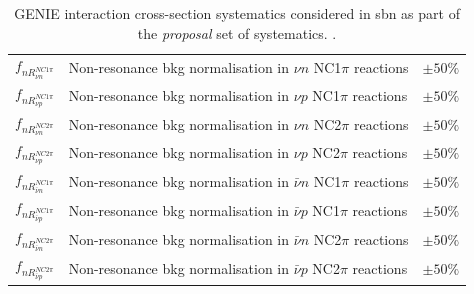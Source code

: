 \begin{table}[h!]
\begin{tabular}{p{1.8cm} p{10cm}>{\centering\arraybackslash}p{ 2.2cm}}
         $f_{nR_{\nu n}^{NC1\pi}}$ & Non-resonance bkg normalisation in $\nu n$ NC1$\pi$ reactions & $\pm 50\%$ \\
         
         $f_{nR_{\nu p}^{NC1\pi}}$ & Non-resonance bkg normalisation in $\nu p$ NC1$\pi$ reactions & $\pm 50\%$ \\
         
         $f_{nR_{\nu n}^{NC2\pi}}$ & Non-resonance bkg normalisation in $\nu n$ NC2$\pi$ reactions & $\pm 50\%$ \\
         
         $f_{nR_{\nu p}^{NC2\pi}}$ & Non-resonance bkg normalisation in $\nu p$ NC2$\pi$ reactions & $\pm 50\%$ \\
         
         $f_{nR_{\bar{\nu} n}^{NC1\pi}}$ & Non-resonance bkg normalisation in $\bar{\nu} n$ NC1$\pi$ reactions & $\pm 50\%$ \\
         
         $f_{nR_{\bar{\nu} p}^{NC1\pi}}$ & Non-resonance bkg normalisation in $\bar{\nu} p$ NC1$\pi$ reactions & $\pm 50\%$ \\
         
         $f_{nR_{\bar{\nu} n}^{NC2\pi}}$ & Non-resonance bkg normalisation in $\bar{\nu} n$ NC2$\pi$ reactions & $\pm 50\%$ \\
         
         $f_{nR_{\bar{\nu} p}^{NC2\pi}}$ & Non-resonance bkg normalisation in $\bar{\nu} p$ NC2$\pi$ reactions & $\pm 50\%$ \\
        
        \bottomrule
        
    \end{tabular}
    \caption[SBN proposal interaction cross-section systematic parameters]{GENIE interaction cross-section systematics considered in \gls{sbn} as part of the \textit{proposal} set of systematics. \cite{GENIE_manual}.}
    \label{}
\end{table}


